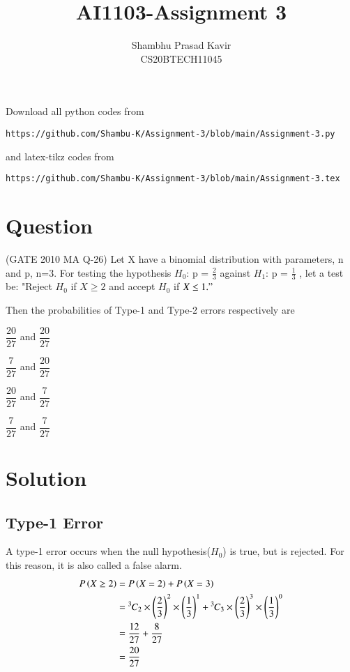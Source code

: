 \documentclass[journal,12pt,twocolumn]{IEEEtran}
\begin{document}
\vspace{3cm}
\title{AI1103-Assignment 3}
\author{Shambhu Prasad Kavir\\CS20BTECH11045}
\maketitle
\newpage
\bigskip
\renewcommand{\thefigure}{\theenumi}
\renewcommand{\thetable}{\theenumi}
Download all python codes from 
\begin{lstlisting}
https://github.com/Shambu-K/Assignment-3/blob/main/Assignment-3.py
\end{lstlisting}
%
and latex-tikz codes from 
%
\begin{lstlisting}
https://github.com/Shambu-K/Assignment-3/blob/main/Assignment-3.tex
\end{lstlisting}
\section*{Question}
(GATE 2010 MA Q-26) \newline
Let X have a binomial distribution with parameters, n and p, n=3. For testing the hypothesis $H_0$: p = \( \frac{2}{3} \) against $H_1$: p =  \( \frac{1}{3} \) , let a test be: "Reject $H_0$ if $X \geq 2$ and accept $H_0$ if $X \leq 1."$ 
\item Then the probabilities of Type-1 and Type-2 errors respectively are

\begin{enumerate}[(A)]
\begin{multicols}{2}
\setlength\itemsep{2em}

\item $\dfrac{20}{27}$ and $\dfrac{20}{27}$
\item  $\dfrac{7}{27}$ and $\dfrac{20}{27}$
\item  $\dfrac{20}{27}$ and $\dfrac{7}{27}$
\item  $\dfrac{7}{27}$ and $\dfrac{7}{27}$

\end{multicols}
\end{enumerate}


\section*{Solution}
\subsection{Type-1 Error}
A type-1 error occurs when the null hypothesis($H_0$) is true, but is rejected. For this reason, it is also called a false alarm.
\begin{align}
P\left(X \geq 2\right) &= P\left(X=2\right) + P\left(X=3\right) \\
&= {{}^{3}\mkern-1muC_{2}} \times \left(\frac{2}{3}\right)^{2} \times  \left(\frac{1}{3}\right) ^{1} + {{}^{3}\mkern-1muC_{3}} \times \left(\frac{2}{3}\right)^{3} \times  \left(\frac{1}{3}\right) ^{0} \\
&= \frac{12}{27} + \frac{8}{27} \\
&= \frac{20}{27} 
\end{align}
\end{document}
